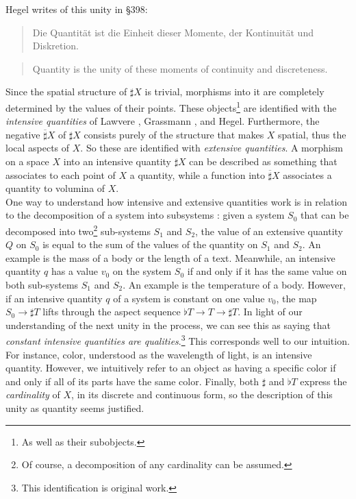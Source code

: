 \documentclass{article}
\begin{document}
Hegel writes of this unity in §398:

\begin{quote}
    Die Quantität ist die Einheit dieser Momente, der Kontinuität und Diskretion.
\end{quote}

\begin{quote}
    Quantity is the unity of these moments of continuity and discreteness.
\end{quote}

Since the spatial structure of $\sharp X$ is trivial, morphisms into it are completely determined by the 
values of their points. These objects\footnote{As well as their subobjects.} are identified with the 
\emph{intensive quantities} of Lawvere \cite{Law82}, Grassmann \cite{Grass}, and Hegel. Furthermore, the 
negative $\overline{\sharp} X$ of $\sharp X$ consists purely of the structure that makes $X$ spatial, thus 
the local aspects of $X$. So these are identified with \emph{extensive quantities}. A morphism on a space $X$
into an intensive quantity $\sharp X$ can be described as something that associates to each point of $X$ a
quantity, while a function into $\overline{\sharp} X$ associates a quantity to volumina of $X$. \\

One way to 
understand how intensive and extensive quantities work is in relation to the decomposition of a system into
subsystems \cite{nlabie}: given a system $S_0$ that can be decomposed into two\footnote{Of course, a
decomposition of any cardinality can be assumed.} sub-systems $S_1$ and $S_2$, the value of an extensive
quantity $Q$ on $S_0$ is equal to the sum of the values of the quantity on $S_1$ and $S_2$. An example is the
mass of a body or the length of a text. Meanwhile, an intensive quantity $q$ has a value $v_0$ on the system
$S_0$ if and only if it has the same value on both sub-systems $S_1$ and $S_2$. An example is the temperature
of a body. However, if an intensive quantity $q$ of a system is constant on one value $v_0$, the map 
$S_0\rightarrow\sharp T$ lifts through the aspect sequence $\flat T\rightarrow T\rightarrow\sharp T$. In
light of our understanding of the next unity in the process, we can see this as saying that \emph{constant
intensive quantities are qualities}.\footnote{This identification is original work.} This corresponds well to
our intuition. For instance, color, understood as the wavelength of light, is an intensive quantity. However,
we intuitively refer to an object as having a specific color if and only if all of its parts have the same 
color. Finally, both $\sharp$ and $\flat T$ express the \emph{cardinality} of $X$, in its discrete and
continuous form, so the description of this unity as quantity seems justified. \\
\end{document}
